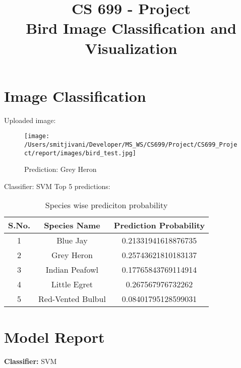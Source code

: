 \documentclass{article}
\date{}
\title{CS 699 - Project\\ Bird Image Classification and Visualization}
\begin{document}
\maketitle

\section{Image Classification}

\noindent Uploaded image:

\begin{figure}[h!]
\centering
\texttt{[image: /Users/smitjivani/Developer/MS\_WS/CS699/Project/CS699\_Project/report/images/bird\_test.jpg]}
\caption*{Prediction: Grey Heron}
\label{fig:method}
\end{figure}

\noindent Classifier: SVM
\newline
\newline
\newline
\noindent Top 5 predictions:
\newline
\begin{table}[h!]
\centering
\begin{tabular}{|c|c|c|} 
\hline
 S.No. & Species Name & Prediction Probability\\ 
\hline
 1 & Blue Jay & 0.21331941618876735 \\ 
 \hline
 2 & Grey Heron & 0.25743621810183137 \\  
 \hline
 3 & Indian Peafowl & 0.17765843769114914 \\    
 \hline
 4 & Little Egret & 0.267567976732262 \\    
 \hline
 5 & Red-Vented Bulbul & 0.08401795128599031 \\    
 \hline
\end{tabular}
\caption{Species wise prediciton probability}
\label{table:data}
\end{table}




\newpage
\section{Model Report}

\textbf{Classifier:} SVM
\newline
\end{document}
